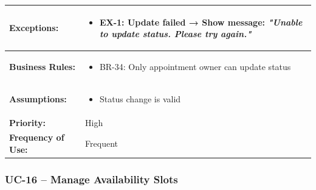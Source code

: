 \documentclass[12pt,a4paper]{article}
\begin{document}
\begin{longtable}{|p{4.5cm}|p{10.5cm}|}
\textbf{Exceptions:} &
\begin{itemize}
  \item EX-1: Update failed → Show message: \textit{"Unable to update status. Please try again."}
\end{itemize} \\
\hline
\textbf{Business Rules:} &
\begin{itemize}
  \item BR-34: Only appointment owner can update status
\end{itemize} \\
\hline
\textbf{Assumptions:} &
\begin{itemize}
  \item Status change is valid
\end{itemize} \\
\hline
\textbf{Priority:} & High \\
\hline
\textbf{Frequency of Use:} & Frequent \\
\hline
\end{longtable}

\subsubsection{UC-16 – Manage Availability Slots}
\end{document}
